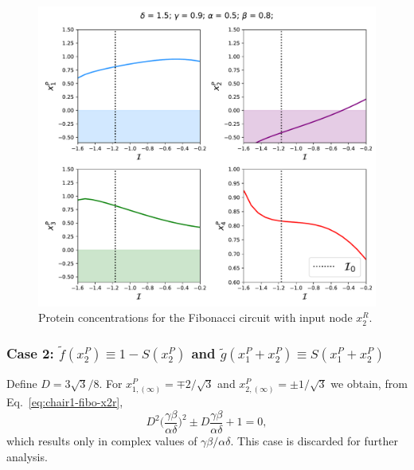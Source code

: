 \begin{figure}[H]
    \centering
    \includegraphics[scale=0.5]{figs/numerics/fibo_x2r_case1.pdf}
    \caption{Protein concentrations for the Fibonacci circuit with input node $x_2^R$.}
    \label{fig:case1-fibo-chair}
\end{figure}

\subsubsection{Case 2: $\tilde{f}(x_2^P) \equiv 1 - S(x_2^P)$ and $\tilde{g}(x_1^P + x_2^P) \equiv S(x_1^P + x_2^P)$}

Define $D = 3\sqrt{3}/8$. For $x_{1,(\infty)}^P = \mp 2/\sqrt{3}$ and $x_{2,(\infty)}^P = \pm 1/\sqrt{3}$ we obtain,
 from Eq.~\ref{eq:chair1-fibo-x2r},  
\begin{equation}
    D^2\bigg(\frac{\gamma\beta}{\alpha\delta}\bigg)^2 \pm D\frac{\gamma\beta}{\alpha\delta} + 1 = 0,
\end{equation}
which results only in complex values of $\gamma\beta/\alpha\delta$. This case is discarded for further analysis.

